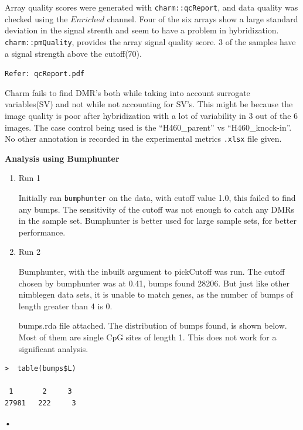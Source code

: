 \documentclass[11pt]{article}
\begin{document}
Array quality scores were generated with {\tt charm::qcReport}, and data quality was checked using the $Enriched$ channel. Four of the six arrays show a large standard deviation in the signal strenth and seem to have a problem in hybridization. {\tt charm::pmQuality}, provides the array signal quality score. 3 of the samples have a signal strength above the cutoff(70).

{\tt Refer: qcReport.pdf}


Charm fails to find DMR’s both while taking into account surrogate variables(SV) and not while not accounting for SV's. This might be because the image quality is poor after hybridization with a lot of variability in 3 out of the 6 images. The case control being used is the “H460\_parent” vs “H460\_knock-in”. No other annotation is recorded in the experimental metrics {\tt .xlsx} file given.



{\bf Analysis using Bumphunter}

\begin{enumerate}

\item Run  1

Initially ran {\tt bumphunter} on the data, with cutoff value 1.0, this failed to find any bumps. The sensitivity of the cutoff was not enough to catch any DMRs in the sample set. Bumphunter is better used for large sample sets, for better performance. 


\item Run  2

Bumphunter, with the inbuilt argument to pickCutoff was run. The cutoff chosen by bumphunter was at 0.41, bumps found 28206. But just like other nimblegen data sets, it is unable to match genes, as the number of bumps of length greater than 4 is 0.

bumps.rda file attached. The distribution of bumps found, is shown below. Most of them are single CpG sites of length 1. This does not work for a significant analysis.

\end{enumerate}


\begin{verbatim}
>  table(bumps$L)

 1       2     3 
27981   222     3 
\end{verbatim}•
\end{document}
